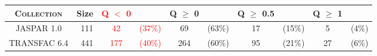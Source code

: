 \documentclass{article}
\begin{document}
\begin{center}

\noindent\begin{minipage}{\linewidth}%
\begin{center}%

\begin{tabular}{|>{\scshape}c|r||cr|cr||cr|cr|}
\hline
\rowcolor[gray]{0.9}
\color{black} \bfseries \scshape Collection & Size & \textcolor{red}{\bfseries \scshape Q $<$ 0} &  &\bfseries \scshape Q $\geq$ 0 & &\bfseries \scshape Q $\geq$ 0.5 & &\bfseries \scshape Q $\geq$ 1 & \\
\hline			   
JASPAR 1.0 & 111 & \textcolor{red}{42} & \textcolor{red}{(37\%)} & 69 & (63\%) & 17 & (15\%) & 5 & (4\%)\\
\hline
TRANSFAC 6.4 & 441 & \textcolor{red}{177} & \textcolor{red}{(40\%)} & 264 & (60\%) & 95 & (21\%) & 27 & (6\%)\\
\hline
\end{tabular}%
\end{center}%
\end{minipage}%

\end{center}%
\end{document}
